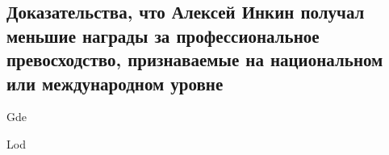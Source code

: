 \subsection{%
    Доказательства, что Алексей Инкин получал меньшие награды за профессиональное превосходство,
    признаваемые на национальном или международном уровне%
}
\label{subsec:Awards}

{Gde}

\pagebreak

{Lod}

\pagebreak
